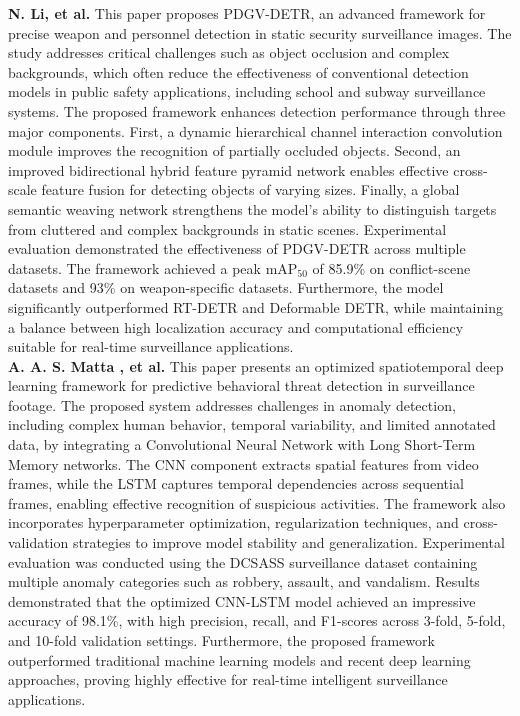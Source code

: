 \textbf{N. Li, et al.} This paper proposes PDGV-DETR, an advanced framework for precise weapon and personnel detection in static security surveillance images. The study addresses critical challenges such as object occlusion and complex backgrounds, which often reduce the effectiveness of conventional detection models in public safety applications, including school and subway surveillance systems. The proposed framework enhances detection performance through three major components. First, a dynamic hierarchical channel interaction convolution module improves the recognition of partially occluded objects. Second, an improved bidirectional hybrid feature pyramid network enables effective cross-scale feature fusion for detecting objects of varying sizes. Finally, a global semantic weaving network strengthens the model’s ability to distinguish targets from cluttered and complex backgrounds in static scenes. Experimental evaluation demonstrated the effectiveness of PDGV-DETR across multiple datasets. The framework achieved a peak mAP$_{50}$ of 85.9\% on conflict-scene datasets and 93\% on weapon-specific datasets. Furthermore, the model significantly outperformed RT-DETR and Deformable DETR, while maintaining a balance between high localization accuracy and computational efficiency suitable for real-time surveillance applications. \cite{supplementary_paper_8} \\

\textbf{A. A. S. Matta , et al.} This paper presents an optimized spatiotemporal deep learning framework for predictive behavioral threat detection in surveillance footage. The proposed system addresses challenges in anomaly detection, including complex human behavior, temporal variability, and limited annotated data, by integrating a Convolutional Neural Network with Long Short-Term Memory networks. The CNN component extracts spatial features from video frames, while the LSTM captures temporal dependencies across sequential frames, enabling effective recognition of suspicious activities. The framework also incorporates hyperparameter optimization, regularization techniques, and cross-validation strategies to improve model stability and generalization. Experimental evaluation was conducted using the DCSASS surveillance dataset containing multiple anomaly categories such as robbery, assault, and vandalism. Results demonstrated that the optimized CNN-LSTM model achieved an impressive accuracy of 98.1\%, with high precision, recall, and F1-scores across 3-fold, 5-fold, and 10-fold validation settings. Furthermore, the proposed framework outperformed traditional machine learning models and recent deep learning approaches, proving highly effective for real-time intelligent surveillance applications. \cite{supplementary_paper_9} \\

